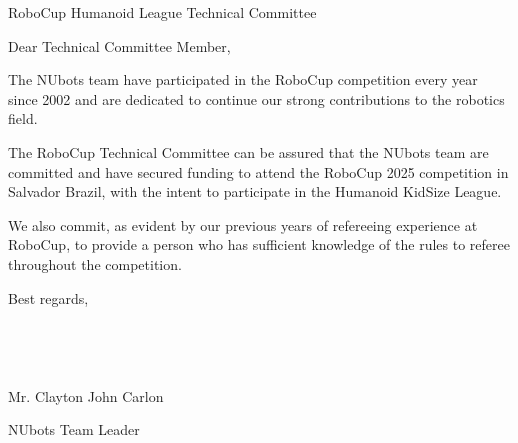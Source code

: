 \documentclass{letter}
\begin{document}
\begin{letter}{RoboCup Humanoid League Technical Committee}
\opening{Dear Technical Committee Member,}

The NUbots team have participated in the RoboCup competition every year since 2002 and are dedicated to continue our strong contributions to the robotics field.

The RoboCup Technical Committee can be assured that the NUbots team are committed and have secured funding to attend the RoboCup 2025 competition in Salvador Brazil, with the intent to participate in the Humanoid KidSize League.

We also commit, as evident by our previous years of refereeing experience at RoboCup, to provide a person who has sufficient knowledge of the rules to referee throughout the competition.

Best regards, \\ \\ \\ \\ \\ 

\hspace*{20pt} Mr. Clayton John Carlon

NUbots Team Leader

\end{letter}
\end{document}
